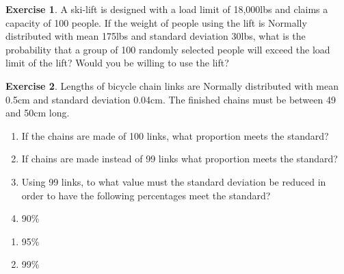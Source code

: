 \documentclass[
]{book}
\providecommand{\tightlist}{%
  \setlength{\itemsep}{0pt}\setlength{\parskip}{0pt}}
\theoremstyle{definition}
\theoremstyle{definition}
\theoremstyle{definition}
\newtheorem{exercise}{Exercise}[chapter]
\theoremstyle{definition}
\theoremstyle{remark}
\begin{document}
\begin{exercise}
A ski-lift is designed with a load limit of 18,000lbs and claims a
capacity of 100 people. If the weight of people using the lift is Normally
distributed with mean 175lbs and standard deviation 30lbs, what is the
probability that a group of 100 randomly selected people will exceed the load
limit of the lift? Would you be willing to use the lift?
\end{exercise}

\begin{exercise}

Lengths of bicycle chain links are Normally distributed with mean
0.5cm and standard deviation 0.04cm. The finished chains must be between 49
and 50cm long.

\begin{enumerate}
\def\labelenumi{\alph{enumi})}
\item
  If the chains are made of 100 links, what proportion meets the
  standard?
\item
  If chains are made instead of 99 links what proportion meets the
  standard?
\item
  Using 99 links, to what value must the standard deviation be reduced in
  order to have the following percentages meet the standard?
\item
  90\%\\
\end{enumerate}

\begin{enumerate}
\def\labelenumi{\roman{enumi})}
\setcounter{enumi}{1}
\tightlist
\item
  95\%\\
\item
  99\%\\
\end{enumerate}

\end{exercise}
\end{document}
